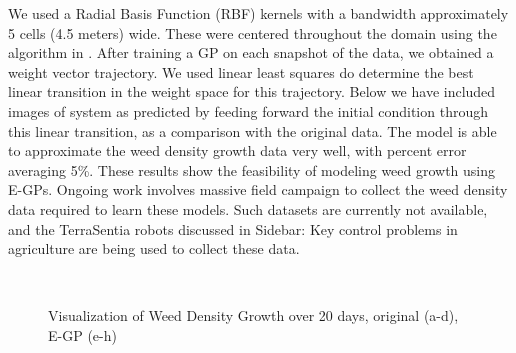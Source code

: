 We used a Radial Basis Function (RBF) kernels with a bandwidth approximately 5 cells (4.5 meters) wide. These were centered throughout the domain using the algorithm in \cite{csato2001sparse}. After training a GP on each snapshot of the data, we obtained a weight vector trajectory. We used linear least squares do determine the best linear transition in the weight space for this trajectory. Below we have included images of system as predicted by feeding forward the initial condition through this linear transition, as a comparison with the original data. The model is able to approximate the weed density growth data very well, with percent error averaging 5\%. These results show the feasibility of modeling weed growth using E-GPs. Ongoing work involves massive field campaign to collect the weed density data required to learn these models. Such datasets are currently not available, and the TerraSentia robots discussed in Sidebar: Key control problems in agriculture are being used to collect these data.

\begin{figure*}[h] %
	\centering
	\\
	
	\caption{Visualization of Weed Density Growth over 20 days, original (a-d), E-GP (e-h)}
	\label{fig:weed_egp}
\end{figure*}



